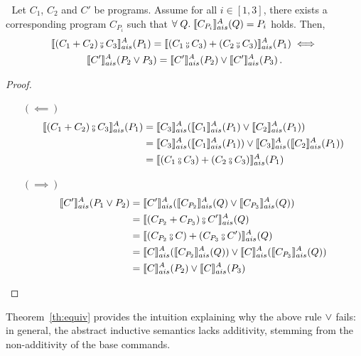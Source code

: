 \documentclass[
  10pt,       %
  twoside,    %
  a4paper,    %
  english,    %
  tikz,       %
  openright,  %
]{book}
\begin{document}
\begin{theorem}\label{th:equiv} $\;$
Let $C_1$, $C_2$ and $C'$ be programs. Assume for all $i \in [1, 3]$, there exists
a corresponding program $C_{P_i}$ such that 
  $\forall \; Q. \; \llbracket C_{P_i} \rrbracket_{ais}^{A}(Q) = P_i$ holds. Then, 
\begin{multline*}
  \asem{(C_1 + C_2) \fcmp C_3}(P_1) = \asem{(C_1 \fcmp C_3) + (C_2 \fcmp C_3)}(P_1)
  \iff\\
  \asem{C'}(P_2 \join P_3) = \asem{C'}(P_2) \join \asem{C'}(P_3)\, .
\end{multline*}
  
\end{theorem}
\begin{proof} \ \
  \begin{itemize}
    \item[$(\impliedby)$]
      \begin{align*}
        \asem{(C_1 + C_2) \fcmp C_3}(P_1)
          &= \asem{C_3}(\asem{C_1}(P_1) \join \asem{C_2}(P_1)) \\
          &= \asem{C_3}(\asem{C_1}(P_1)) \join \asem{C_3}(\asem{C_2}(P_1)) \\
          &= \asem{(C_1 \fcmp C_3) + (C_2 \fcmp C_3)}(P_1)
      \end{align*}
    \item[$(\implies)$]
      \begin{align*}
        \asem{C'}(P_1 \join P_2) 
          &= \asem{C'}(\asem{C_{P_2}}(Q) \join \asem{C_{P_3}}(Q)) \\
          &= \asem{(C_{P_2} + C_{P_3}) \fcmp C'}(Q) \\
          &= \asem{(C_{P_2} \fcmp C) + (C_{P_3} \fcmp C')}(Q) \\
          &= \asem{C}(\asem{C_{P_2}}(Q)) \join \asem{C}(\asem{C_{P_3}}(Q)) \\
          &= \asem{C}(P_2) \join \asem{C}(P_3)
      \end{align*}
  \end{itemize}
\end{proof}

Theorem~\ref{th:equiv}  provides the intuition explaining why the above rule $\lor$ fails:
in general, the
abstract inductive semantics lacks additivity, stemming from the non-additivity of 
the base commands.
\end{document}
